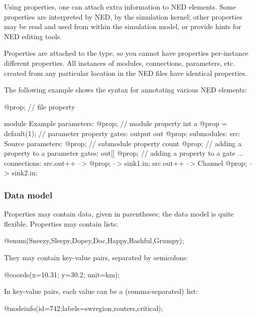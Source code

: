 
Using properties, one can attach extra information to NED elements. Some
properties are interpreted by NED, by the simulation kernel; other
properties may be read and used from within the simulation model, or
provide hints for NED editing tools.

Properties are attached to the type, so you cannot have properties
per-instance different properties. All instances of modules, connections,
parameters, etc. created from any particular location in the NED files have
identical properties.

The following example shows the syntax for annotating various NED elements:

\begin{ned}
@prop;  // file property

module Example
{
    parameters:
       @prop;   // module property
       int a @prop = default(1); // parameter property
    gates:
       output out @prop;
    submodules:
       src: Source {
           parameters:
              @prop;  // submodule property
              count @prop;  // adding a property to a parameter
           gates:
              out[] @prop;  // adding a property to a gate
       }
       ...
    connections:
       src.out++ --> { @prop; } --> sink1.in;
       src.out++ --> Channel { @prop; } --> sink2.in;
}
\end{ned}


\subsubsection{Data model}

Properties may contain data, given in parentheses; the data model is quite
flexible. Properties may contain lists:

\begin{ned}
@enum(Sneezy,Sleepy,Dopey,Doc,Happy,Bashful,Grumpy);
\end{ned}

They may contain key-value pairs, separated by semicolons:

\begin{ned}
@coords(x=10.31; y=30.2; unit=km);
\end{ned}

In key-value pairs, each value can be a (comma-separated) list:

\begin{ned}
@nodeinfo(id=742;labels=swregion,routers,critical);
\end{ned}

